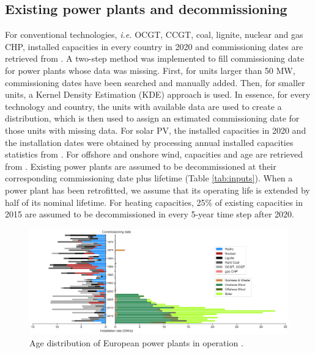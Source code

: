 \documentclass[3p]{elsarticle} %
\begin{document}
\subsection{Existing power plants and decommissioning}

For conventional technologies, \textit{i.e.} OCGT, CCGT, coal, lignite, nuclear and gas CHP, installed capacities in every country in 2020 and commissioning dates are retrieved from \cite{powerplantmatching}. 
A two-step method was implemented to fill commissioning date for power plants whose data was missing. First, for units larger than 50 MW, commissioning dates have been searched and manually added. Then, for smaller units, a Kernel Density Estimation (KDE) approach is used. In essence, for every technology and country, the units with available data are used to create a distribution, which is then used to assign an estimated commissioning date for those units with missing data. For solar PV, the installed capacities in 2020 and the installation dates were obtained by processing annual installed capacities statistics from \cite{IRENA_2019}. For offshore and onshore wind, capacities and age are retrieved from \cite{thewindpower}. Existing power plants are assumed to be decommissioned at their corresponding commissioning date plus lifetime (Table \ref{tab:inputs}). When a power plant has been retrofitted, we assume that its operating life is extended by half of its nominal lifetime. 
For heating capacities, 25\% of existing capacities in 2015 are assumed to be decommissioned in every 5-year time step after 2020.

\begin{figure}[!h]
\centering
\includegraphics[width=\textwidth]{figures/age_distribution_existing.png}
\caption{Age distribution of European power plants in operation \cite{powerplantmatching, IRENA_2019}.} 
\end{figure}
\end{document}
